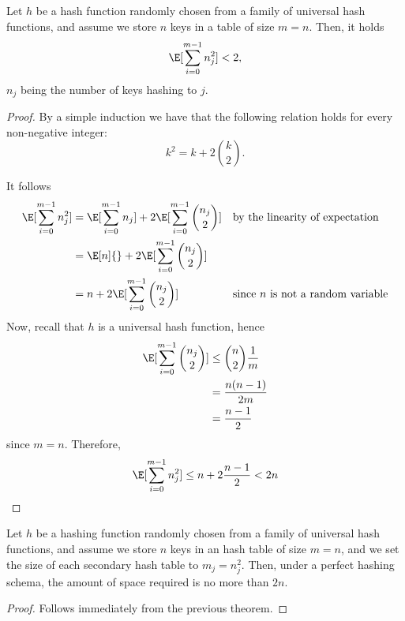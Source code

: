 \documentclass{subfiles}
\begin{document}
    \begin{theorem*}
        Let \(h\) be a hash function randomly chosen from a family of universal hash functions,
            and assume we store \(n\) keys in a table of size \(m = n\).
            Then, it holds
            \[
                \E[\sum_{i = 0}^{m - 1} n_{j}^{2}]{} < 2,
            \]
            \(n_{j}\) being the number of keys hashing to \(j\).
    \end{theorem*}
    \begin{proof}
        By a simple induction we have that the following relation holds for every non-negative integer:
        \[
            k^{2} = k + 2\binom{k}{2}.
        \]

        It follows 
        \[\begin{aligned}
            \E[\sum_{i = 0}^{m - 1} n_{j}^{2}]{} & =
                \E[\sum_{i = 0}^{m - 1} n_{j}]{} +
                2\E[\sum_{i = 0}^{m - 1} \binom{n_{j}}{2}]{} && \text{by the linearity of expectation} \\ 
                & = \E[n]{} + 2\E[\sum_{i = 0}^{m - 1} \binom{n_{j}}{2}]{} \\ 
                & = n + 2\E[\sum_{i = 0}^{m - 1} \binom{n_{j}}{2}]{} && \text{since \(n\) is not a random variable}
        \end{aligned}\]
        Now, recall that \(h\) is a universal hash function, hence 
        \[\begin{aligned}
            \E[\sum_{i = 0}^{m - 1} \binom{n_{j}}{2}]{} & \le \binom{n}{2}\frac{1}{m}  \\ 
                & = \frac{n(n - 1)}{2m} \\
                & = \frac{n - 1}{2}
        \end{aligned}\]
        since \(m = n\). Therefore, 
        \[
            \E[\sum_{i = 0}^{m - 1} n_{j}^{2}]{} \le n + 2 \frac{n - 1}{2} < 2n
        \]
    \end{proof}
    \begin{corollary*}
        Let \(h\) be a hashing function randomly chosen from a family of universal hash functions,
            and assume we store \(n\) keys in an hash table of size \(m = n\),
            and we set the size of each secondary hash table to \(m_{j} = n^{2}_{j}\).
            Then, under a perfect hashing schema, the amount of space required is no more than \(2n\).
    \end{corollary*}
    \begin{proof}
        Follows immediately from the previous theorem.
    \end{proof}

    \nocite{CormenLRS2009}
\end{document}
